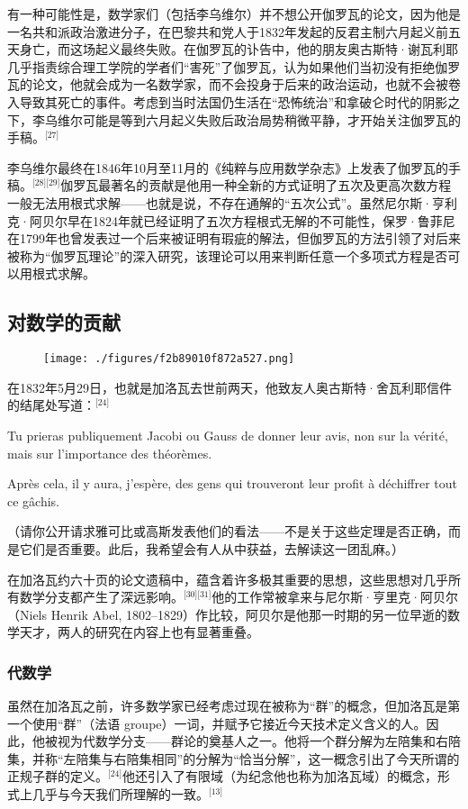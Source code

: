有一种可能性是，数学家们（包括李乌维尔）并不想公开伽罗瓦的论文，因为他是一名共和派政治激进分子，在巴黎共和党人于1832年发起的反君主制六月起义前五天身亡，而这场起义最终失败。在伽罗瓦的讣告中，他的朋友奥古斯特·谢瓦利耶几乎指责综合理工学院的学者们“害死”了伽罗瓦，认为如果他们当初没有拒绝伽罗瓦的论文，他就会成为一名数学家，而不会投身于后来的政治运动，也就不会被卷入导致其死亡的事件。考虑到当时法国仍生活在“恐怖统治”和拿破仑时代的阴影之下，李乌维尔可能是等到六月起义失败后政治局势稍微平静，才开始关注伽罗瓦的手稿。\(^\text{[27]}\)

李乌维尔最终在1846年10月至11月的《纯粹与应用数学杂志》上发表了伽罗瓦的手稿。\(^\text{[28][29]}\)伽罗瓦最著名的贡献是他用一种全新的方式证明了五次及更高次数方程一般无法用根式求解——也就是说，不存在通解的“五次公式”。虽然尼尔斯·亨利克·阿贝尔早在1824年就已经证明了五次方程根式无解的不可能性，保罗·鲁菲尼在1799年也曾发表过一个后来被证明有瑕疵的解法，但伽罗瓦的方法引领了对后来被称为“伽罗瓦理论”的深入研究，该理论可以用来判断任意一个多项式方程是否可以用根式求解。
\subsection{对数学的贡献}
\begin{figure}[ht]
\centering
\texttt{[image: ./figures/f2b89010f872a527.png]}
\caption{} \label{fig_AWLS_6}
\end{figure}
在1832年5月29日，也就是加洛瓦去世前两天，他致友人奥古斯特·舍瓦利耶信件的结尾处写道：\(^\text{[24]}\)

Tu prieras publiquement Jacobi ou Gauss de donner leur avis, non sur la vérité, mais sur l'importance des théorèmes.

Après cela, il y aura, j'espère, des gens qui trouveront leur profit à déchiffrer tout ce gâchis.

（请你公开请求雅可比或高斯发表他们的看法——不是关于这些定理是否正确，而是它们是否重要。此后，我希望会有人从中获益，去解读这一团乱麻。）

在加洛瓦约六十页的论文遗稿中，蕴含着许多极其重要的思想，这些思想对几乎所有数学分支都产生了深远影响。\(^\text{[30][31]}\)他的工作常被拿来与尼尔斯·亨里克·阿贝尔（Niels Henrik Abel, 1802–1829）作比较，阿贝尔是他那一时期的另一位早逝的数学天才，两人的研究在内容上也有显著重叠。
\subsubsection{代数学}
虽然在加洛瓦之前，许多数学家已经考虑过现在被称为“群”的概念，但加洛瓦是第一个使用“群”（法语 groupe）一词，并赋予它接近今天技术定义含义的人。因此，他被视为代数学分支——群论的奠基人之一。他将一个群分解为左陪集和右陪集，并称“左陪集与右陪集相同”的分解为“恰当分解”，这一概念引出了今天所谓的正规子群的定义。\(^\text{[24]}\)他还引入了有限域（为纪念他也称为加洛瓦域）的概念，形式上几乎与今天我们所理解的一致。\(^\text{[13]}\)

